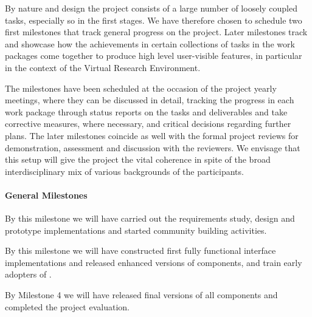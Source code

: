 

By nature and design the project consists of a large number of loosely
coupled tasks, especially so in the first stages. We have therefore
chosen to schedule two first milestones that track general progress on
the project. Later milestones track and showcase how the achievements
in certain collections of tasks in the work packages come together to
produce high level user-visible features, in particular in the context
of the Virtual Research Environment.

The milestones have been scheduled at the occasion of the project
yearly meetings, where they can be discussed in detail, tracking the
progress in each work package through status reports on the tasks and
deliverables and take corrective measures, where necessary, and
critical decisions regarding further plans. The later milestones
coincide as well with the formal project reviews for demonstration,
assessment and discussion with the reviewers.
%
We envisage that this
setup will give the project the vital coherence in spite of the broad
interdisciplinary mix of various backgrounds of the participants.

\paragraph{General Milestones}

\begin{milestones}
  {By this milestone we will have carried out the requirements study, design and prototype implementations and started community building activities.}

  {By this milestone we will have constructed first fully functional interface implementations and released enhanced versions of \TheProject components, and train early adopters of \TheProject.}

  {By Milestone 4 we will have released final versions of all \TheProject components and completed the project evaluation.}
\end{milestones}

